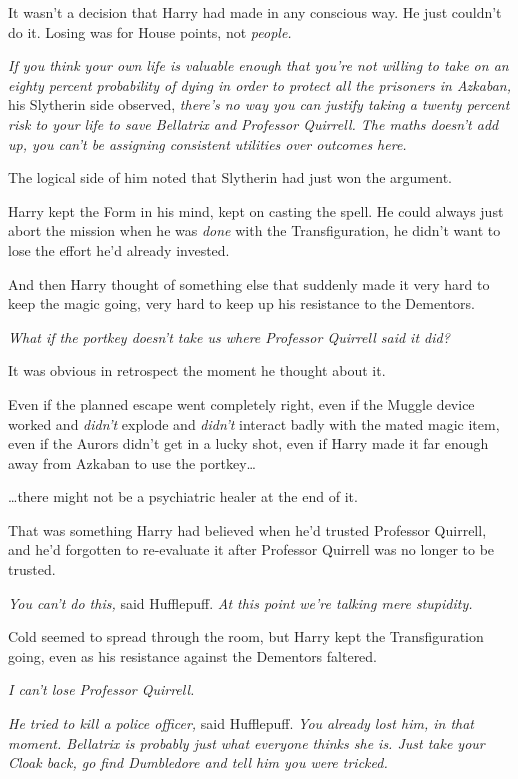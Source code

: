 It wasn't a decision that Harry had made in any conscious way. He just couldn't
do it. Losing was for House points, not \emph{people.}

\emph{If you think your own life is valuable enough that you're not willing to
take on an eighty percent probability of dying in order to protect all the
prisoners in Azkaban,} his Slytherin side observed, \emph{there's no way you
can justify taking a twenty percent risk to your life to save Bellatrix and
Professor Quirrell. The maths doesn't add up, you can't be assigning consistent
utilities over outcomes here.}

The logical side of him noted that Slytherin had just won the argument.

Harry kept the Form in his mind, kept on casting the spell. He could always
just abort the mission when he was \emph{done} with the Transfiguration, he
didn't want to lose the effort he'd already invested.

And then Harry thought of something else that suddenly made it very hard to
keep the magic going, very hard to keep up his resistance to the Dementors.

\emph{What if the portkey doesn't take us where Professor Quirrell said it did?}

It was obvious in retrospect the moment he thought about it.

Even if the planned escape went completely right, even if the Muggle device
worked and \emph{didn't} explode and \emph{didn't} interact badly with the
mated magic item, even if the Aurors didn't get in a lucky shot, even if Harry
made it far enough away from Azkaban to use the portkey{\ldots}

{\ldots}there might not be a psychiatric healer at the end of it.

That was something Harry had believed when he'd trusted Professor Quirrell, and
he'd forgotten to re-evaluate it after Professor Quirrell was no longer to be
trusted.

\emph{You can't do this,} said Hufflepuff.  \emph{At this point we're talking
mere stupidity.}

Cold seemed to spread through the room, but Harry kept the Transfiguration
going, even as his resistance against the Dementors faltered.

\emph{I can't lose Professor Quirrell.}

\emph{He tried to kill a police officer,} said Hufflepuff. \emph{You already
lost him, in that moment. Bellatrix is probably just what everyone thinks she
is. Just take your Cloak back, go find Dumbledore and tell him you were
tricked.}

